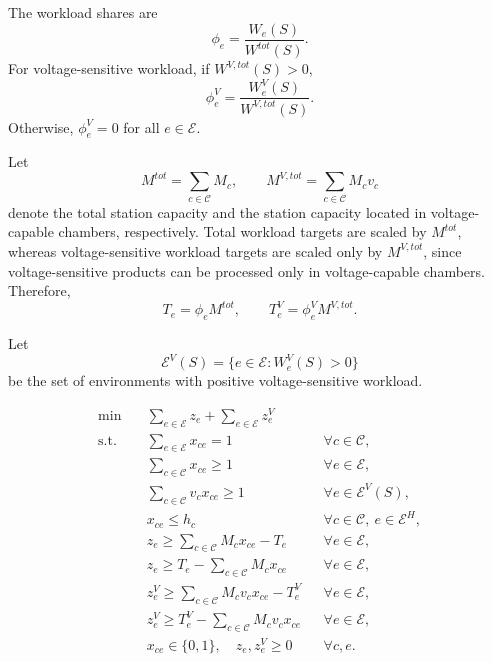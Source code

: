 

The workload shares are
\[
\phi_e=\frac{W_e(S)}{W^{tot}(S)}.
\]
For voltage-sensitive workload, if \(W^{V,tot}(S)>0\),
\[
\phi_e^V=\frac{W_e^V(S)}{W^{V,tot}(S)}.
\]
Otherwise, \(\phi_e^V=0\) for all \(e\in\mathcal{E}\).

Let
\[
M^{tot}=\sum_{c\in\mathcal{C}}M_c,
\qquad
M^{V,tot}=\sum_{c\in\mathcal{C}}M_cv_c
\]
denote the total station capacity and the station capacity located in
voltage-capable chambers, respectively. Total workload targets are scaled by
\(M^{tot}\), whereas voltage-sensitive workload targets are scaled only by
\(M^{V,tot}\), since voltage-sensitive products can be processed only in
voltage-capable chambers. Therefore,
\[
T_e=\phi_e M^{tot},
\qquad
T_e^V=\phi_e^V M^{V,tot}.
\]

Let
\[
\mathcal{E}^V(S)=\{e\in\mathcal{E}: W_e^V(S)>0\}
\]
be the set of environments with positive voltage-sensitive workload.


\begin{align}
\min\quad & \sum_{e\in\mathcal{E}}z_e+\sum_{e\in\mathcal{E}}z_e^V \\
\text{s.t.}\quad
& \sum_{e\in\mathcal{E}}x_{ce}=1 && \forall c\in\mathcal{C},\\
& \sum_{c\in\mathcal{C}}x_{ce}\ge 1 && \forall e\in\mathcal{E},\\
& \sum_{c\in\mathcal{C}}v_cx_{ce}\ge 1 && \forall e\in\mathcal{E}^V(S),\\
& x_{ce}\le h_c && \forall c\in\mathcal{C},\ e\in\mathcal{E}^H,\\
& z_e\ge \sum_{c\in\mathcal{C}}M_cx_{ce}-T_e && \forall e\in\mathcal{E},\\
& z_e\ge T_e-\sum_{c\in\mathcal{C}}M_cx_{ce} && \forall e\in\mathcal{E},\\
& z_e^V\ge \sum_{c\in\mathcal{C}}M_cv_cx_{ce}-T_e^V && \forall e\in\mathcal{E},\\
& z_e^V\ge T_e^V-\sum_{c\in\mathcal{C}}M_cv_cx_{ce} && \forall e\in\mathcal{E},\\
& x_{ce}\in\{0,1\},\quad z_e,z_e^V\ge 0 && \forall c,e.
\end{align}

